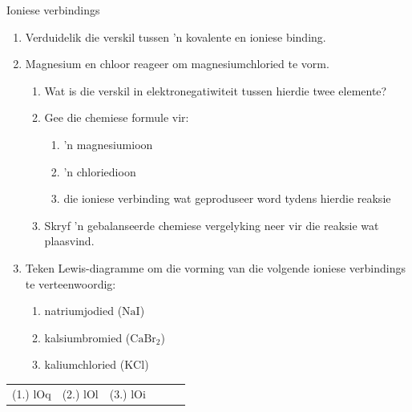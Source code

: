 \begin{exercises}{Ioniese verbindings}
{
            \nopagebreak
        \label{m38684*id142562}\begin{enumerate}[noitemsep, label=\textbf{\arabic*}. ] 
            \label{m38684*uid57}\item Verduidelik die verskil tussen 'n kovalente en ioniese binding.\newline
\label{m38684*uid58}\item Magnesium en chloor reageer om magnesiumchloried te vorm.
\label{m38684*id142602}\begin{enumerate}[noitemsep, label=\textbf{\alph*}. ] 
            \label{m38684*uid59}\item Wat is die verskil in elektronegatiwiteit tussen hierdie twee elemente?
\label{m38684*uid60}\item Gee die chemiese formule vir:
\label{m38684*id142630}\begin{enumerate}[noitemsep, label=\textbf{\roman*}. ] 
            \label{m38684*uid61}\item 'n magnesiumioon
\label{m38684*uid62}\item 'n chloriedioon
\label{m38684*uid63}\item die ioniese verbinding wat geproduseer word tydens hierdie reaksie
\end{enumerate}
        \label{m38684*uid64}\item Skryf 'n gebalanseerde chemiese vergelyking neer vir die reaksie wat plaasvind.
\end{enumerate}
        \label{m38684*uid65}\item Teken Lewis-diagramme om die vorming van die volgende ioniese verbindings te verteenwoordig:
\label{m38684*id142697}\begin{enumerate}[noitemsep, label=\textbf{\alph*}. ] 
            \label{m38684*uid66}\item natriumjodied  ($\text{NaI}$)
\label{m38684*uid67}\item kalsiumbromied ($\text{CaBr}{}_{2}$)
\label{m38684*uid68}\item kaliumchloried ($\text{KCl}$)

\end{enumerate}
        \end{enumerate}

\practiceinfo
\begin{tabular}[h]{cccccc}
 (1.) lOq  &  (2.) lOl  &  (3.) lOi  &
\end{tabular}
}
\end{exercises}

